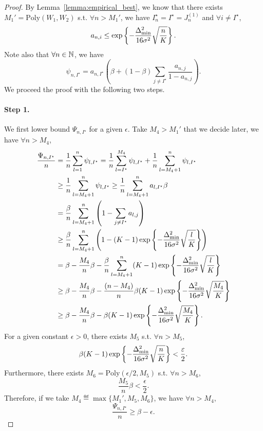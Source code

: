 \begin{proof}
    By Lemma~\ref{lemma:empirical_best}, we know that there exists $M_1' = \text{Poly}(W_1,W_2)$ s.t. $\forall n > M_1'$, we have $I_n^\star = I^\star = J_n^{(1)}$ and $\forall i \neq I^\star$,
    \[
        a_{n,i} \leq \exp\left\{-\frac{\Delta_{\text{min}}^2}{16\sigma^2}\sqrt{\frac{n}{K}}\right\}.
    \]
    Note also that $\forall n\in{\mathbb N}$, we have
    \[
        \psi_{n,I^\star} = a_{n,I^\star} \left(\beta + (1-\beta) \sum_{j\neq I^\star} \frac{a_{n,j}}{1-a_{n,j}}\right).
    \]
    We proceed the proof with the following two steps.
    
    \paragraph{Step 1.} We first lower bound $\Psi_{n,I^\star}$ for a given $\epsilon$. Take $M_4 > M_1'$ that we decide later, we have $\forall n > M_4$,
    \begin{align*}
        \frac{\Psi_{n,I^\star}}{n} &= \frac{1}{n}\sum_{l=1}^{n}\psi_{l,I^\star} = \frac{1}{n}\sum_{l=I^\star}^{M_4}\psi_{l,I^\star} + \frac{1}{n}\sum_{l=M_4+1}^{n}\psi_{l,I^\star}\\
                             &\geq \frac{1}{n}\sum_{l=M_4+1}^{n}\psi_{l,I^\star} \geq \frac{1}{n}\sum_{l=M_4+1}^{n} a_{l,I^\star}\beta\\
                             &= \frac{\beta}{n}\sum_{l=M_4+1}^{n} \left(1-\sum_{j\neq I^\star}a_{l,j}\right)\\
                             &\geq \frac{\beta}{n}\sum_{l=M_4+1}^{n} \left(1-(K-1)\exp\left\{-\frac{\Delta_{\text{min}}^2}{16\sigma^2}\sqrt{\frac{l}{K}}\right\}\right)\\
                             &= \beta - \frac{M_4}{n}\beta - \frac{\beta}{n}\sum_{l=M_4+1}^{n} (K-1)\exp\left\{-\frac{\Delta_{\text{min}}^2}{16\sigma^2}\sqrt{\frac{l}{K}}\right\}\\
                             &\geq \beta - \frac{M_4}{n}\beta - \frac{(n-M_4)}{n}\beta(K-1)\exp\left\{-\frac{\Delta_{\text{min}}^2}{16\sigma^2}\sqrt{\frac{M_4}{K}}\right\}\\
                             &\geq \beta - \frac{M_4}{n}\beta - \beta(K-1)\exp\left\{-\frac{\Delta_{\text{min}}^2}{16\sigma^2}\sqrt{\frac{M_4}{K}}\right\}.
    \end{align*}
    For a given constant $\epsilon>0$, there exists $M_5$ s.t. $\forall n > M_5$,
    \[
        \beta(K-1)\exp\left\{-\frac{\Delta_{\text{min}}^2}{16\sigma^2}\sqrt{\frac{n}{K}}\right\} < \frac{\varepsilon}{2}.
    \]
    Furthermore, there exists $M_6 = \text{Poly}(\epsilon/2,M_5)$ s.t. $\forall n > M_6$,
    \[
        \frac{M_5}{n}\beta < \frac{\epsilon}{2}.
    \]
    Therefore, if we take $M_4 \eqdef \max\{M_1', M_5, M_6\}$, we have $\forall n > M_4$,
    \[
        \frac{\Psi_{n,I^\star}}{n} \geq \beta - \epsilon.
    \]
    

\end{proof}

